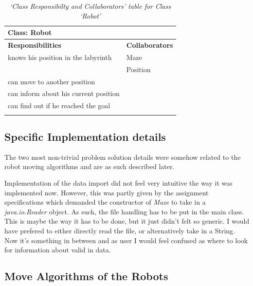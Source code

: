 \documentclass[a4paper,11pt,twoside]{article}
\begin{document}
\begin{table}[]
\centering
\caption{\textit{`Class Responsibilty and Collaborators' table for Class `Robot'}}
\label{tab:crcrobot}
\begin{tabular}{l|l}
Class: Robot                          &                        \\
\hline
\textbf{Responsibilities}             & \textbf{Collaborators} \\
knows his position in the labyrinth   & Maze                   \\
                                      & Position               \\
can move to another position          &                        \\
can inform about his current position &                        \\
can find out if he reached the goal   &                        \\
                                      &                       
\end{tabular}
\end{table}



\subsection{Specific Implementation details}
The two most non-trivial problem solution details were somehow related
to the robot moving algorithms and are as such described later. 

Implementation of the data import did not feel very intuitive the way
it was implemented now. However, this was partly given by the
assignment specifications which demanded the constructor of
\textit{Maze} to take in a \textit{java.io.Reader} object. As such,
the file handling has to be put in the main class. This is maybe
the way it has to be done, but it just didn't felt so generic. I would
have prefered to either directly read the file, or alternatively take
in a String. Now it's something in between and as user I would feel
confused as where to look for information about valid in data. 


\subsection{Move Algorithms of the Robots}
\end{document}
